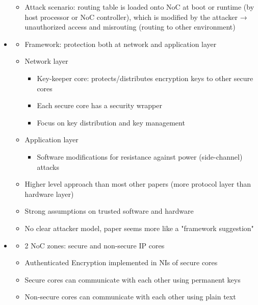\begin{itemize}
\begin{itemize}
            \item Attack scenario: routing table is loaded onto NoC at boot or runtime (by host processor or NoC controller), which is modified by
                the attacker → unauthorized access and misrouting (routing to other environment)
        \end{itemize}
    \item \textbf{}
        \begin{itemize}
            \item Framework: protection both at network and application layer
            \item Network layer
                \begin{itemize}
                    \item Key-keeper core: protects/distributes encryption keys to other secure cores
                    \item Each secure core has a security wrapper
                    \item Focus on key distribution and key management
                \end{itemize}
            \item Application layer
                \begin{itemize}
                    \item Software modifications for resistance against power (side-channel) attacks
                \end{itemize}
            \item Higher level approach than most other papers (more protocol layer than hardware layer)
            \item Strong assumptions on trusted software and hardware
            \item No clear attacker model, paper seems more like a "framework suggestion"
        \end{itemize}
    \item \textbf{}
        \begin{itemize}
            \item 2 NoC zones: secure and non-secure IP cores
            \item Authenticated Encryption implemented in NIs of secure cores
            \item Secure cores can communicate with each other using permanent keys
            \item Non-secure cores can communicate with each other using plain text

\end{itemize}
\end{itemize}
